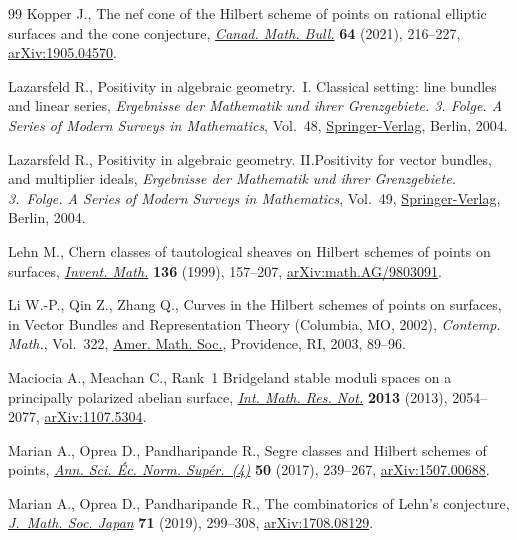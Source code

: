 \documentclass[pdftex]{sigma}
\numberwithin{equation}{section}
\begin{document}
\begin{thebibliography}{99}
Kopper J., The nef cone of the {H}ilbert scheme of points on rational elliptic
 surfaces and the cone conjecture, \href{https://doi.org/10.4153/S0008439520000387}{\textit{Canad. Math. Bull.}} \textbf{64}
 (2021), 216--227, \href{https://arxiv.org/abs/1905.04570}{arXiv:1905.04570}.

Lazarsfeld R., Positivity in algebraic geometry.~{I}. Classical setting: line
 bundles and linear series, \textit{Ergebnisse der Mathematik und ihrer
 Grenzgebiete. 3. Folge. A Series of Modern Surveys in Mathematics}, Vol.~48,
 \href{https://doi.org/10.1007/978-3-642-18808-4}{Springer-Verlag}, Berlin, 2004.

Lazarsfeld R., Positivity in algebraic geometry. {II}.Positivity for vector
 bundles, and multiplier ideals, \textit{Ergebnisse der Mathematik und ihrer
 Grenzgebiete. 3.~Folge. A Series of Modern Surveys in Mathematics}, Vol.~49,
 \href{https://doi.org/10.1007/978-3-642-18810-7}{Springer-Verlag}, Berlin, 2004.

Lehn M., Chern classes of tautological sheaves on {H}ilbert schemes of points
 on surfaces, \href{https://doi.org/10.1007/s002220050307}{\textit{Invent. Math.}} \textbf{136} (1999), 157--207,
 \href{https://arxiv.org/abs/math.AG/9803091}{arXiv:math.AG/9803091}.

Li W.-P., Qin Z., Zhang Q., Curves in the {H}ilbert schemes of points on
 surfaces, in Vector Bundles and Representation Theory ({C}olumbia, {MO},
 2002), \textit{Contemp. Math.}, Vol.~322, \href{https://doi.org/10.1090/conm/322/05681}{Amer. Math. Soc.}, Providence, RI,
 2003, 89--96.

Maciocia A., Meachan C., Rank~1 {B}ridgeland stable moduli spaces on a
 principally polarized abelian surface, \href{https://doi.org/10.1093/imrn/rns107}{\textit{Int. Math. Res. Not.}}
 \textbf{2013} (2013), 2054--2077, \href{https://arxiv.org/abs/1107.5304}{arXiv:1107.5304}.

Marian A., Oprea D., Pandharipande R., Segre classes and {H}ilbert schemes of
 points, \href{https://doi.org/10.24033/asens.2320}{\textit{Ann. Sci. \'Ec. Norm. Sup\'er.~(4)}} \textbf{50} (2017),
 239--267, \href{https://arxiv.org/abs/1507.00688}{arXiv:1507.00688}.

Marian A., Oprea D., Pandharipande R., The combinatorics of {L}ehn's
 conjecture, \href{https://doi.org/10.2969/jmsj/78747874}{\textit{J.~Math. Soc. Japan}} \textbf{71} (2019), 299--308,
 \href{https://arxiv.org/abs/1708.08129}{arXiv:1708.08129}.


\end{thebibliography}
\end{document}
